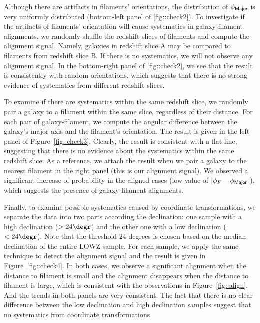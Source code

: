 \documentclass[usenatbib,useAMS]{mnras}
\theoremstyle{remark}
\begin{document}
{{{{{Although there are artifacts in filaments' orientations,
the distribution of $\phi_{\sf Major}$ is very uniformly distributed (bottom-left panel of \autoref{fig::check2}). 
To investigate if the artifacts of filaments' orientation will cause systematics in
galaxy-filament alignments,
we randomly shuffle the redshift slices of filaments and compute the alignment signal.
Namely, galaxies in redshift slice A may be compared to filaments from redshift slice B. 
If there is no systematics, we will not observe any alignment signal. 
In the bottom-right panel of \autoref{fig::check2}, 
we see that the result is consistently with random orientations, which suggests
{
that there is no strong evidence of systematics from different redshift slices.
}

{
To examine if there are systematics within the same redshift slice,
we randomly pair a galaxy to a filament within the same slice, regardless of their distance.
For each pair of galaxy-filament, we compute the angular difference
between the galaxy's major axis and the filament's orientation. 
The result is given in the left panel of Figure~\ref{fig::check3}.
Clearly, the result is consistent with a flat line, suggesting that
there is no evidence about the systematics within the same redshift slice.
As a reference, we attach the result when we pair a galaxy to the nearest filament in the 
right panel (this is our alignment signal).
We observed a  significant increase of probability in the aligned cases (low value of $|\phi_F-\phi_{\sf Major}|$),
which suggests the presence of galaxy-filament alignments. 
}

{
Finally, to examine possible systematics caused by coordinate transformations,
we separate the data into two parts according the declination: 
one sample with a high declination ($>24\degr$)
and the other one with a low declination ($<24\degr$). 
Note that the threshold $24$ degrees is chosen based on the median declination of the entire LOWZ sample.
For each sample, we apply the same technique to detect the alignment signal and
the result is given in Figure~\ref{fig::check4}.
In both cases, we observe a significant alignment when the distance to filament is small
and the alignment disappears when the distance to filament is large, which is consistent with
the observations in Figure~\ref{fig::align}.
And the trends in both panels are very consistent. 
The fact that there is no clear difference between the low declination and high declination samples
suggest that no systematics from coordinate transformations.
}

}}}}}
\end{document}
